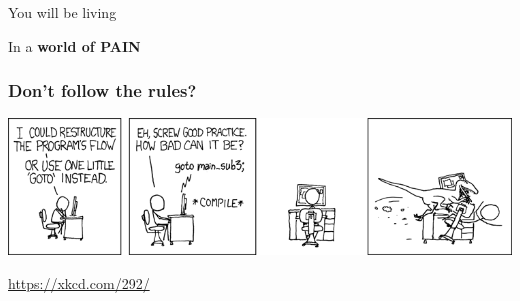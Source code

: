 \documentclass[xcolor={x11names,svgnames},x11names,svgnames]{beamer}
\begin{document}

\begin{frame}[label=world_of_pain]
  \Huge

  
    \begin{center}


  \pause
  \vspace{1cm}
  

  \pause
  \vspace{1cm}
  
  \scalebox{1.1}You will be living \\

  \bigskip

  In a \textbf{world   of \alert{PAIN}}
\end{center}
\end{frame}


\begin{frame}
  \frametitle{Don't follow the rules?}

  \centering
  \includegraphics[width=\textwidth]{goto.png}

  \medskip

  \url{https://xkcd.com/292/}
\end{frame}


\end{document}
